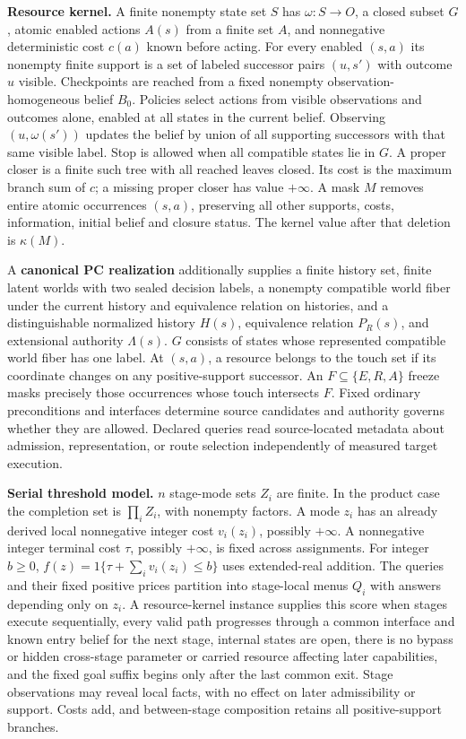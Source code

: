 \textbf{Resource kernel.} A finite nonempty state set \(S\) has \(\omega:S\to O\), a closed subset \(G\), atomic enabled actions \(A(s)\) from a finite set \(A\), and nonnegative deterministic cost \(c(a)\) known before acting. For every enabled \((s,a)\) its nonempty finite support is a set of labeled successor pairs \((u,s')\) with outcome \(u\) visible. Checkpoints are reached from a fixed nonempty observation-homogeneous belief \(B_0\). Policies select actions from visible observations and outcomes alone, enabled at all states in the current belief. Observing \((u,\omega(s'))\) updates the belief by union of all supporting successors with that same visible label. Stop is allowed when all compatible states lie in \(G\). A proper closer is a finite such tree with all reached leaves closed. Its cost is the maximum branch sum of \(c\); a missing proper closer has value \(+\infty\). A mask \(M\) removes entire atomic occurrences \((s,a)\), preserving all other supports, costs, information, initial belief and closure status. The kernel value after that deletion is \(\kappa(M)\).

A \textbf{canonical PC realization} additionally supplies a finite history set, finite latent worlds with two sealed decision labels, a nonempty compatible world fiber under the current history and equivalence relation on histories, and a distinguishable normalized history \(H(s)\), equivalence relation \(P_R(s)\), and extensional authority \(\Lambda(s)\). \(G\) consists of states whose represented compatible world fiber has one label. At \((s,a)\), a resource belongs to the touch set if its coordinate changes on any positive-support successor. An \(F\subseteq\{E,R,A\}\) freeze masks precisely those occurrences whose touch intersects \(F\). Fixed ordinary preconditions and interfaces determine source candidates and authority governs whether they are allowed. Declared queries read source-located metadata about admission, representation, or route selection independently of measured target execution.

\textbf{Serial threshold model.} \(n\) stage-mode sets \(Z_i\) are finite. In the product case the completion set is \(\prod_i Z_i\), with nonempty factors. A mode \(z_i\) has an already derived local nonnegative integer cost \(v_i(z_i)\), possibly \(+\infty\). A nonnegative integer terminal cost \(\tau\), possibly \(+\infty\), is fixed across assignments. For integer \(b\ge0\), \(f(z)=1\{\tau+\sum_i v_i(z_i)\le b\}\) uses extended-real addition. The queries and their fixed positive prices partition into stage-local menus \(Q_i\) with answers depending only on \(z_i\). A resource-kernel instance supplies this score when stages execute sequentially, every valid path progresses through a common interface and known entry belief for the next stage, internal states are open, there is no bypass or hidden cross-stage parameter or carried resource affecting later capabilities, and the fixed goal suffix begins only after the last common exit. Stage observations may reveal local facts, with no effect on later admissibility or support. Costs add, and between-stage composition retains all positive-support branches.


